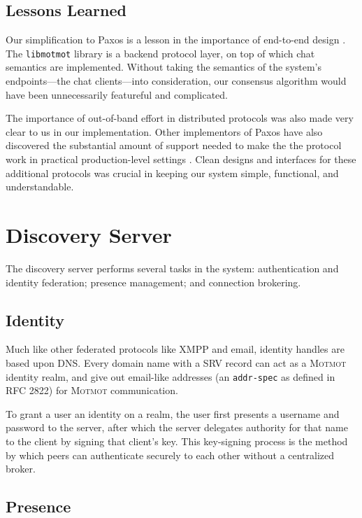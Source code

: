 \documentclass{sig-alternate}
\newcommand\Motmot{\textsc{Motmot}\xspace}
\newcommand\libmotmot{\texttt{libmotmot}\xspace}
\begin{document}
\subsection{Lessons Learned}

Our simplification to Paxos is a lesson in the importance of end-to-end design
\cite{end2end}.  The \libmotmot library is a backend protocol layer, on top of
which chat semantics are implemented.  Without taking the semantics of the
system's endpoints---the chat clients---into consideration, our consensus
algorithm would have been unnecessarily featureful and complicated.

The importance of out-of-band effort in distributed protocols was also made
very clear to us in our implementation.  Other implementors of Paxos have also
discovered the substantial amount of support needed to make the the protocol
work in practical production-level settings \cite{paxlive}.  Clean designs
and interfaces for these additional protocols was crucial in keeping our
system simple, functional, and understandable.

\section{Discovery Server}

The discovery server performs several tasks in the system: authentication and
identity federation; presence management; and connection brokering.

\subsection{Identity}

Much like other federated protocols like XMPP and email, identity handles are
based upon DNS. Every domain name with a SRV record can act as a \Motmot
identity realm, and give out email-like addresses (an \verb`addr-spec` as
defined in RFC 2822) for \Motmot communication.

To grant a user an identity on a realm, the user first presents a username and
password to the server, after which the server delegates authority for that name
to the client by signing that client's key. This key-signing process is the
method by which peers can authenticate securely to each other without a
centralized broker.

\subsection{Presence}
\end{document}
